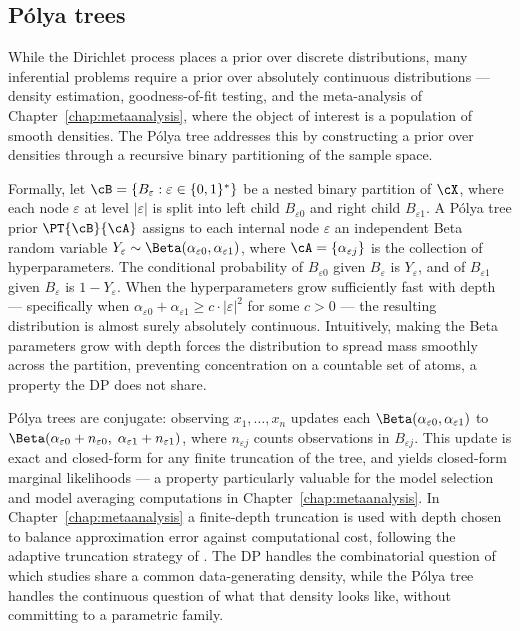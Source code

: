 \subsection{P\'{o}lya trees}
\label{subsec:intro:polytrees}

While the Dirichlet process places a prior over discrete distributions,
many inferential problems require a prior over absolutely continuous
distributions --- density estimation, goodness-of-fit testing, and the
meta-analysis of Chapter~\ref{chap:metaanalysis}, where the object of
interest is a population of smooth densities.  The P\'{o}lya tree
\citep{Lavine1992, MauldinSudderethWilliams1992} addresses this by
constructing a prior over densities through a recursive binary partitioning
of the sample space.

Formally, let $\cB = \{B_\varepsilon : \varepsilon \in \{0,1\}^*\}$ be a
nested binary partition of $\cX$, where each node $\varepsilon$ at level
$|\varepsilon|$ is split into left child $B_{\varepsilon 0}$ and right
child $B_{\varepsilon 1}$.  A P\'{o}lya tree prior $\PT{\cB}{\cA}$ assigns
to each internal node $\varepsilon$ an independent Beta random variable
$Y_\varepsilon \sim \Beta(\alpha_{\varepsilon 0}, \alpha_{\varepsilon 1})$,
where $\cA = \{\alpha_{\varepsilon j}\}$ is the collection of
hyperparameters.  The conditional probability of $B_{\varepsilon 0}$ given
$B_\varepsilon$ is $Y_\varepsilon$, and of $B_{\varepsilon 1}$ given
$B_\varepsilon$ is $1 - Y_\varepsilon$.  When the hyperparameters grow
sufficiently fast with depth --- specifically when $\alpha_{\varepsilon 0}
+ \alpha_{\varepsilon 1} \geq c \cdot |\varepsilon|^2$ for some $c > 0$
\citep{Lavine1992} --- the resulting distribution is almost surely
absolutely continuous.  Intuitively, making the Beta parameters grow with
depth forces the distribution to spread mass smoothly across the partition,
preventing concentration on a countable set of atoms, a property the DP
does not share.

P\'{o}lya trees are conjugate: observing $x_1, \ldots, x_n$ updates each
$\Beta(\alpha_{\varepsilon 0}, \alpha_{\varepsilon 1})$ to
$\Beta(\alpha_{\varepsilon 0} + n_{\varepsilon 0},\; \alpha_{\varepsilon 1}
+ n_{\varepsilon 1})$, where $n_{\varepsilon j}$ counts observations in
$B_{\varepsilon j}$.  This update is exact and closed-form for any finite
truncation of the tree, and yields closed-form marginal likelihoods
\citep{BergerGuglielmi2001, HolmesChoudhuriBhattacharya2003} --- a
property particularly valuable for the model selection and model averaging
computations in Chapter~\ref{chap:metaanalysis}.  In
Chapter~\ref{chap:metaanalysis} a finite-depth truncation is used with
depth chosen to balance approximation error against computational cost,
following the adaptive truncation strategy of
\citet{TrippaHolmesJohnson2011}.  The DP handles the combinatorial
question of which studies share a common data-generating density, while the
P\'{o}lya tree handles the continuous question of what that density looks
like, without committing to a parametric family.

